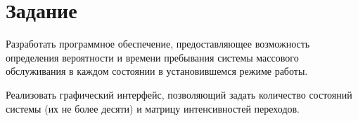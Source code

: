 \chapter{Задание}

Разработать программное обеспечение, предоставляющее возможность определения
вероятности и времени пребывания системы массового обслуживания в каждом
состоянии в установившемся режиме работы. 

Реализовать графический интерфейс, позволяющий задать количество состояний
системы (их не более десяти) и матрицу интенсивностей переходов.

